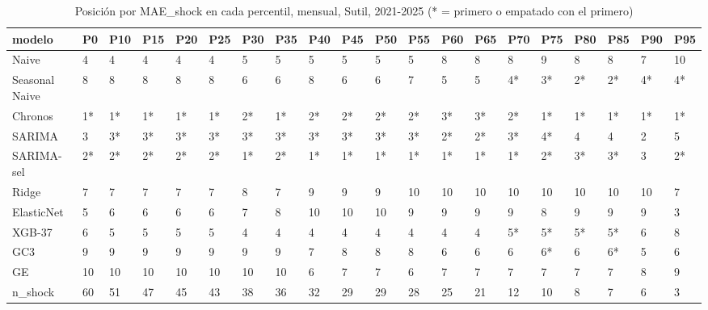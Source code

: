 \begin{table}[H]
\centering
\small
\caption{Posición por MAE\_shock en cada percentil, mensual, Sutil, 2021-2025 (* = primero o empatado con el primero)}
\label{tab:T_barrido_posiciones_mensual_sutil}
\begin{tabular}{llllllllllllllllllll}
\toprule
modelo & P0 & P10 & P15 & P20 & P25 & P30 & P35 & P40 & P45 & P50 & P55 & P60 & P65 & P70 & P75 & P80 & P85 & P90 & P95 \\
\midrule
Naive & 4 & 4 & 4 & 4 & 4 & 5 & 5 & 5 & 5 & 5 & 5 & 8 & 8 & 8 & 9 & 8 & 8 & 7 & 10 \\
Seasonal Naive & 8 & 8 & 8 & 8 & 8 & 6 & 6 & 8 & 6 & 6 & 7 & 5 & 5 & 4* & 3* & 2* & 2* & 4* & 4* \\
Chronos & 1* & 1* & 1* & 1* & 1* & 2* & 1* & 2* & 2* & 2* & 2* & 3* & 3* & 2* & 1* & 1* & 1* & 1* & 1* \\
SARIMA & 3 & 3* & 3* & 3* & 3* & 3* & 3* & 3* & 3* & 3* & 3* & 2* & 2* & 3* & 4* & 4 & 4 & 2 & 5 \\
SARIMA-sel & 2* & 2* & 2* & 2* & 2* & 1* & 2* & 1* & 1* & 1* & 1* & 1* & 1* & 1* & 2* & 3* & 3* & 3 & 2* \\
Ridge & 7 & 7 & 7 & 7 & 7 & 8 & 7 & 9 & 9 & 9 & 10 & 10 & 10 & 10 & 10 & 10 & 10 & 10 & 7 \\
ElasticNet & 5 & 6 & 6 & 6 & 6 & 7 & 8 & 10 & 10 & 10 & 9 & 9 & 9 & 9 & 8 & 9 & 9 & 9 & 3 \\
XGB-37 & 6 & 5 & 5 & 5 & 5 & 4 & 4 & 4 & 4 & 4 & 4 & 4 & 4 & 5* & 5* & 5* & 5* & 6 & 8 \\
GC3 & 9 & 9 & 9 & 9 & 9 & 9 & 9 & 7 & 8 & 8 & 8 & 6 & 6 & 6 & 6* & 6 & 6* & 5 & 6 \\
GE & 10 & 10 & 10 & 10 & 10 & 10 & 10 & 6 & 7 & 7 & 6 & 7 & 7 & 7 & 7 & 7 & 7 & 8 & 9 \\
n\_shock & 60 & 51 & 47 & 45 & 43 & 38 & 36 & 32 & 29 & 29 & 28 & 25 & 21 & 12 & 10 & 8 & 7 & 6 & 3 \\
\bottomrule
\end{tabular}
\end{table}